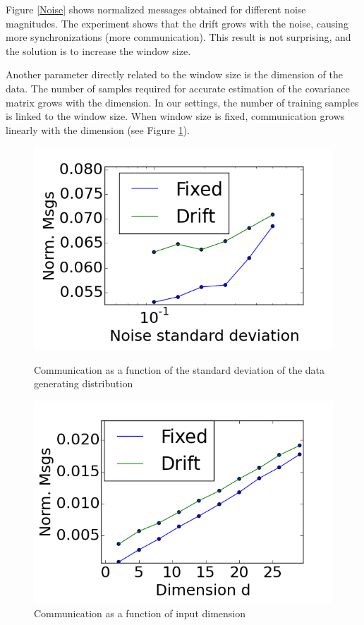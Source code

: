 Figure \ref{Noise} shows normalized messages obtained for different
noise magnitudes. The experiment shows that the drift grows with the noise, causing more synchronizations (more communication). This result is not surprising, and the solution is to increase the window size.

Another parameter directly related to the window size is the dimension of the data. The number of samples required for accurate estimation of the covariance matrix grows with the dimension. In our settings, the number of training samples is linked to the window size. When window size is fixed, communication grows linearly with the dimension (see Figure \ref{Dimension}).



\begin{figure}[!htb]
  \includegraphics[width=\linewidth]{CommunicationOfFixedVsDrift/Noise.png}
  \caption{Communication as a function of the standard deviation of the
	data generating distribution}\label{Noise}
\endminipage\hfill
{}
  \includegraphics[width=\linewidth]{CommunicationOfFixedVsDrift/Dimension.png}
  \caption{Communication as a function of input dimension}\label{Dimension}
\endminipage
\end{figure}


